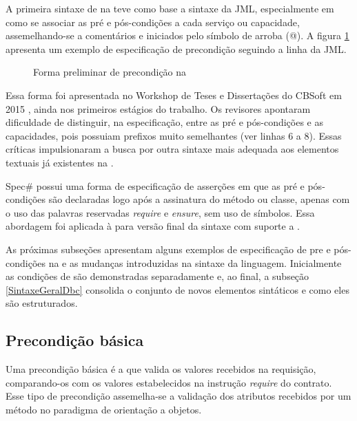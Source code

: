 A primeira sintaxe de \designbycontract{} na \neoidl{} teve como
base a sintaxe da JML, especialmente em como se associar as pré e
pós-condições a cada serviço ou capacidade, assemelhando-se a comentários e iniciados pelo
símbolo de arroba (@). A figura \ref{lst:precondicaoJML-neo} apresenta um
exemplo de especificação de precondição seguindo a linha da JML.

\vspace{6mm}

\begin{figure}[h]
\begin{small}

\vspace{-.5cm}
\end{small} 
\caption{Forma preliminar de precondição na \neoidl}
\label{lst:precondicaoJML-neo}
\end{figure}

Essa forma foi apresentada no Workshop de Teses e Dissertações do CBSoft em 2015
\cite{lima2015contratos}, ainda nos primeiros estágios do trabalho. Os revisores
apontaram dificuldade de distinguir, na especificação, entre as pré e
pós-condições e as capacidades, pois possuiam prefixos muito
semelhantes (ver linhas 6 a 8).
Essas críticas impulsionaram a busca por outra sintaxe mais adequada aos elementos textuais já
existentes na \neoidl{}.

Spec\# possui uma forma de especificação de asserções em que as pré e
pós-condições são declaradas logo após a assinatura do método ou classe, apenas
com o uso das palavras reservadas \emph{require} e \emph{ensure}, sem uso de
símbolos. Essa abordagem foi aplicada à \neoidl{} para versão final da sintaxe
com suporte a \designbycontract{}.

As próximas subseções apresentam alguns exemplos de especificação de pre e
pós-condições na \neoidl{} e as mudanças introduzidas na sintaxe da linguagem.
Inicialmente as condições de \designbycontract{} são demonstradas separadamente
e, ao final, a subseção \ref{SintaxeGeralDbc} consolida o conjunto
de novos elementos sintáticos e como eles são estruturados.


\subsection{Precondição básica}
\label{precondicaoBasica}

Uma precondição básica é a que valida os valores recebidos na
requisição, comparando-os com os valores estabelecidos na instrução
\emph{require} do contrato. Esse tipo de precondição assemelha-se a validação
dos atributos recebidos por um método no paradigma de orientação a objetos.

